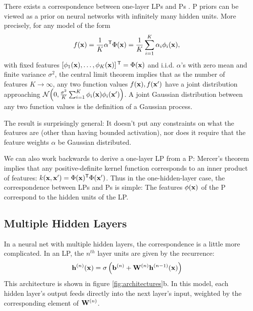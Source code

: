 \documentclass[twoside]{article}
\makeatletter
\newlength{\nonHumbleHeight}
\def\@humbleformat#1{{\settoheight{\nonHumbleHeight}{#1}\resizebox{!}{0.94\nonHumbleHeight}{#1}}}%
\def\humble#1{\@humbleformat{#1}}%
\newcommand{\gp}{{\humble GP}}
\newcommand{\MLP}{{\humble MLP}}
\makeatother
\begin{document}
There exists a correspondence between one-layer \MLP{}s and \gp{}s \citep{neal1995bayesian}.  \gp{} priors can be viewed as a prior on neural networks with infinitely many hidden units.  More precisely, for any model of the form
%
\begin{align}
f({\bf{x}}) = \frac{1}{K}{\mathbf \alpha}{^\mathsf{T}} \Phi({\bf{x}}) = \frac{1}{K} \sum_{i=1}^K \alpha_i \phi_i({\bf{x}}),
\label{eq:one-layer-nn}
\end{align}
%
with fixed features $\left[ \phi_1({\bf{x}}), \dots, \phi_K({\bf{x}}) \right]{^\ensuremath{\mathsf{T}}} = \Phi({\bf{x}})$ and i.i.d. $\alpha$'s with zero mean and finite variance $\sigma^2$, the central limit theorem implies that as the number of features $K \rightarrow \infty$, any two function values $f({\bf{x}}), f({\bf{x}}')$ have a joint distribution approaching $\mathcal{N}\!\left(0,\frac{\sigma^2}{K}\sum_{i=1}^K \phi_i({\bf{x}})\phi_i({\bf{x}}')\right)$.  A joint Gaussian distribution between any two function values is the definition of a Gaussian process.

The result is surprisingly general:  It doesn't put any constraints on what the features are (other than having bounded activation), nor does it require that the feature weights $\alpha$ be Gaussian distributed.  

We can also work backwards to derive a one-layer \MLP{} from a \gp{}:  Mercer's theorem implies that any positive-definite kernel function corresponds to an inner product of features: $k({\bf{x}}, {\bf{x}}') = \Phi({\bf{x}}) {^\mathsf{T}} \Phi({\bf{x}}')$.
%
Thus in the one-hidden-layer case, the correspondence between \MLP{}s and \gp{}s is simple:  The features $\phi({\bf{x}})$ of the \gp{} correspond to the hidden units of the \MLP{}.


\subsection{Multiple Hidden Layers}

In a neural net with multiple hidden layers, the correspondence is a little more complicated.  In an \MLP{}, the $n^{th}$ layer units are given by the recurrence:
%
\begin{align}
{\bf{h}}^{(n)}({\bf{x}}) = \sigma \left( {\bf{b}}^{(n)} + \mathbf{W}^{(n)} {\bf{h}}^{(n-1)}({\bf{x}}) \right)
\end{align}
%
This architecture is shown in figure \ref{fig:architectures}b.  
%
%
In this model, each hidden layer's output feeds directly into the next layer's input, weighted by the corresponding element of $\mathbf{W}^{(n)}$.  
\end{document}
